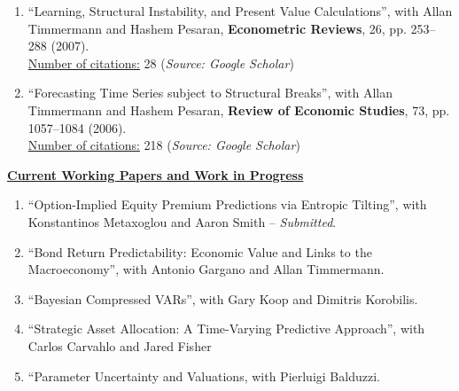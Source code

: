 \documentclass[12pt]{article}
\begin{document}
\begin{enumerate}
	\item ``Learning, Structural Instability, and Present Value Calculations'', with Allan Timmermann and Hashem Pesaran, \textbf{Econometric Reviews}, 26, pp. 253--288 (2007). \\
	\underline{Number of citations:} 28 (\emph{Source: Google Scholar})

	\item ``Forecasting Time Series subject to Structural Breaks'', with Allan Timmermann and Hashem Pesaran, \textbf{Review of Economic Studies}, 73, pp. 1057--1084 (2006). \\
	\underline{Number of citations:} 218 (\emph{Source: Google Scholar})

    \setcounter{enumTemp}{\theenumi}
 \end{enumerate}
\underline{\textbf{Current Working Papers and Work in Progress}}
\begin{enumerate}
	\setcounter{enumi}{\theenumTemp}
	\item ``Option-Implied Equity Premium Predictions via Entropic Tilting'', with Konstantinos Metaxoglou  and Aaron Smith -- \textit{Submitted}.
	\item ``Bond Return Predictability: Economic Value and Links to the Macroeconomy'', with Antonio Gargano and Allan Timmermann.
	\item ``Bayesian Compressed VARs'', with Gary Koop and Dimitris Korobilis.
	\item ``Strategic Asset Allocation: A Time-Varying Predictive Approach'', with Carlos Carvahlo and Jared Fisher 
	\item ``Parameter Uncertainty and Valuations, with Pierluigi Balduzzi.
	
\end{enumerate}
\end{document}
